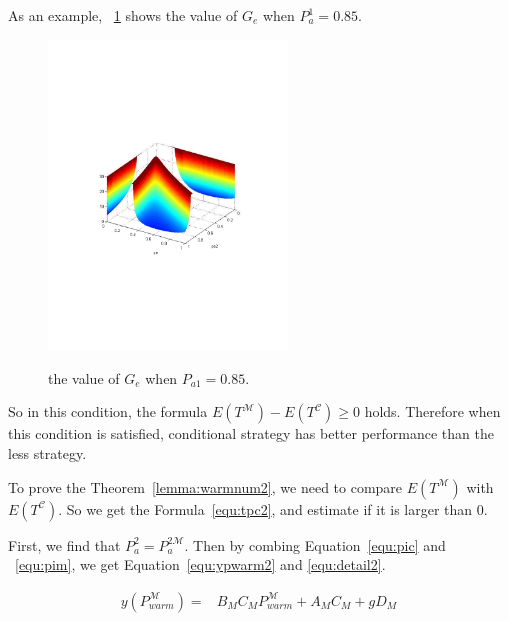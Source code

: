 As an example,
\figurename~\ref{fig:Gexpression} shows the value of $G_e$ when $P_{a}^{\mathfrak{1}} = 0.85$.
\begin{figure}
  \centering
  \includegraphics[width=2.5in]{pic/Gexpression.pdf}\\
  \caption{the value of $G_e$ when $P_{a1} = 0.85$.}\label{fig:Gexpression}
\end{figure}

%

   So in this condition, the formula $E(T^{\mathcal{M}})-E(T^{\mathcal{C}}) \geq 0$ holds.
Therefore when this condition is satisfied, conditional {\vwarm} strategy has better performance than the less {\vwarm} strategy.

To prove the Theorem~\ref{lemma:warmnum2}, we need to compare $E(T^{\mathcal{M}})$ with $E(T^{\mathcal{C}})$.
So we get the Formula~\ref{equ:tpc2}, and estimate if it is larger than $0$.

First, we find that $P_{a}^{\mathfrak{2}} = P_{a}^{\mathfrak{2}\mathcal{M}}$.
Then by combing Equation~\ref{equ:pic} and ~\ref{equ:pim}, we get Equation~\ref{equ:ypwarm2} and \ref{equ:detail2}.


\begin{equation}
\label{equ:ypwarm2}
\begin{split}
y(P_{warm}^{\mathcal{M}}) = &B_{M}C_{M}P_{warm}^{\mathcal{M}}+A_{M}C_{M}+gD_{M} \,
\end{split}\end{equation}

